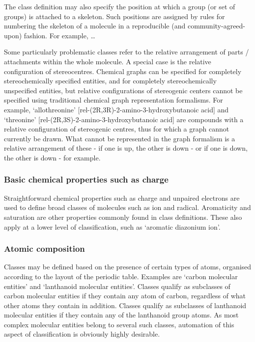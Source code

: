 \documentclass[10pt]{bmc_article}
\newenvironment{bmcformat}{\baselineskip20pt\sloppy\setboolean{publ}{false}}{\baselineskip20pt\sloppy}
\begin{document}
\begin{bmcformat}
The class definition may also specify the position at which a group (or set of groups) is attached to a skeleton. Such positions are assigned by rules for numbering the skeleton of a molecule in a reproducible (and community-agreed-upon) fashion.  For example, \ldots

Some particularly problematic classes refer to the relative arrangement of parts / attachments within the whole molecule. A special case is the relative configuration of stereocentres. Chemical graphs can be specified for completely stereochemically specified entities, and for completely stereochemically unspecified entities, but relative configurations of stereogenic centers cannot be specified using traditional chemical graph representation formalisms. For example, `allothreonine' [rel-(2R,3R)-2-amino-3-hydroxybutanoic acid] and `threonine' [rel-(2R,3S)-2-amino-3-hydroxybutanoic acid] are compounds with a relative configuration of stereogenic centres, thus for which a graph cannot currently be drawn. What cannot be represented in the graph formalism is a relative arrangement of these - if one is up, the other is down - or if one is down, the other is down - for example. 


\subsubsection*{Basic chemical properties such as charge}

Straightforward chemical properties such as charge and unpaired electrons are used to define broad classes of molecules such as ion and radical. Aromaticity and saturation are other properties commonly found in class definitions. These also apply at a lower level of classification, such as `aromatic diazonium ion'.  


\subsubsection*{Atomic composition}

Classes may be defined based on the presence of certain types of atoms, organised according to the layout of the periodic table.  Examples are `carbon molecular entities' and `lanthanoid molecular entities'. Classes qualify as subclasses of carbon molecular entities if they contain any atom of carbon, regardless of what other atoms they contain in addition.  Classes qualify as subclasses of lanthanoid molecular entities if they contain any of the lanthanoid group atoms.  As most complex molecular entities belong to several such classes, automation of this aspect of classification is obviously highly desirable. 



\end{bmcformat}
\end{document}
